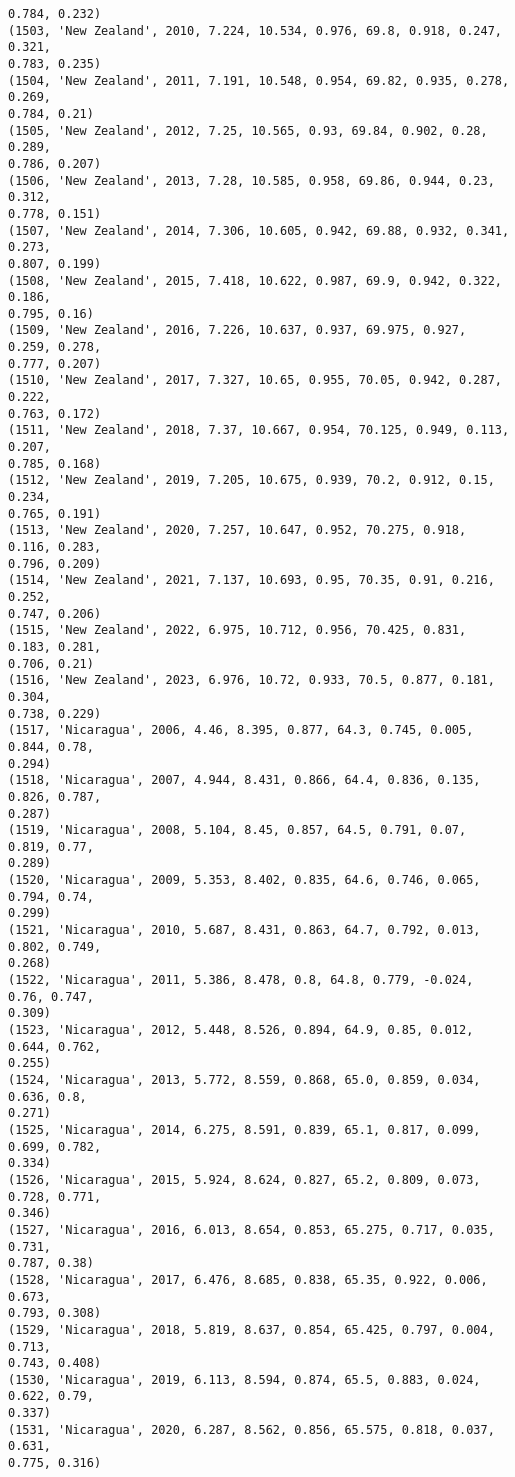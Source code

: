 \documentclass[11pt]{article}
\begin{document}
\begin{Verbatim}[commandchars=\\\{\}]
0.784, 0.232)
(1503, 'New Zealand', 2010, 7.224, 10.534, 0.976, 69.8, 0.918, 0.247, 0.321,
0.783, 0.235)
(1504, 'New Zealand', 2011, 7.191, 10.548, 0.954, 69.82, 0.935, 0.278, 0.269,
0.784, 0.21)
(1505, 'New Zealand', 2012, 7.25, 10.565, 0.93, 69.84, 0.902, 0.28, 0.289,
0.786, 0.207)
(1506, 'New Zealand', 2013, 7.28, 10.585, 0.958, 69.86, 0.944, 0.23, 0.312,
0.778, 0.151)
(1507, 'New Zealand', 2014, 7.306, 10.605, 0.942, 69.88, 0.932, 0.341, 0.273,
0.807, 0.199)
(1508, 'New Zealand', 2015, 7.418, 10.622, 0.987, 69.9, 0.942, 0.322, 0.186,
0.795, 0.16)
(1509, 'New Zealand', 2016, 7.226, 10.637, 0.937, 69.975, 0.927, 0.259, 0.278,
0.777, 0.207)
(1510, 'New Zealand', 2017, 7.327, 10.65, 0.955, 70.05, 0.942, 0.287, 0.222,
0.763, 0.172)
(1511, 'New Zealand', 2018, 7.37, 10.667, 0.954, 70.125, 0.949, 0.113, 0.207,
0.785, 0.168)
(1512, 'New Zealand', 2019, 7.205, 10.675, 0.939, 70.2, 0.912, 0.15, 0.234,
0.765, 0.191)
(1513, 'New Zealand', 2020, 7.257, 10.647, 0.952, 70.275, 0.918, 0.116, 0.283,
0.796, 0.209)
(1514, 'New Zealand', 2021, 7.137, 10.693, 0.95, 70.35, 0.91, 0.216, 0.252,
0.747, 0.206)
(1515, 'New Zealand', 2022, 6.975, 10.712, 0.956, 70.425, 0.831, 0.183, 0.281,
0.706, 0.21)
(1516, 'New Zealand', 2023, 6.976, 10.72, 0.933, 70.5, 0.877, 0.181, 0.304,
0.738, 0.229)
(1517, 'Nicaragua', 2006, 4.46, 8.395, 0.877, 64.3, 0.745, 0.005, 0.844, 0.78,
0.294)
(1518, 'Nicaragua', 2007, 4.944, 8.431, 0.866, 64.4, 0.836, 0.135, 0.826, 0.787,
0.287)
(1519, 'Nicaragua', 2008, 5.104, 8.45, 0.857, 64.5, 0.791, 0.07, 0.819, 0.77,
0.289)
(1520, 'Nicaragua', 2009, 5.353, 8.402, 0.835, 64.6, 0.746, 0.065, 0.794, 0.74,
0.299)
(1521, 'Nicaragua', 2010, 5.687, 8.431, 0.863, 64.7, 0.792, 0.013, 0.802, 0.749,
0.268)
(1522, 'Nicaragua', 2011, 5.386, 8.478, 0.8, 64.8, 0.779, -0.024, 0.76, 0.747,
0.309)
(1523, 'Nicaragua', 2012, 5.448, 8.526, 0.894, 64.9, 0.85, 0.012, 0.644, 0.762,
0.255)
(1524, 'Nicaragua', 2013, 5.772, 8.559, 0.868, 65.0, 0.859, 0.034, 0.636, 0.8,
0.271)
(1525, 'Nicaragua', 2014, 6.275, 8.591, 0.839, 65.1, 0.817, 0.099, 0.699, 0.782,
0.334)
(1526, 'Nicaragua', 2015, 5.924, 8.624, 0.827, 65.2, 0.809, 0.073, 0.728, 0.771,
0.346)
(1527, 'Nicaragua', 2016, 6.013, 8.654, 0.853, 65.275, 0.717, 0.035, 0.731,
0.787, 0.38)
(1528, 'Nicaragua', 2017, 6.476, 8.685, 0.838, 65.35, 0.922, 0.006, 0.673,
0.793, 0.308)
(1529, 'Nicaragua', 2018, 5.819, 8.637, 0.854, 65.425, 0.797, 0.004, 0.713,
0.743, 0.408)
(1530, 'Nicaragua', 2019, 6.113, 8.594, 0.874, 65.5, 0.883, 0.024, 0.622, 0.79,
0.337)
(1531, 'Nicaragua', 2020, 6.287, 8.562, 0.856, 65.575, 0.818, 0.037, 0.631,
0.775, 0.316)

\end{Verbatim}
\end{document}
